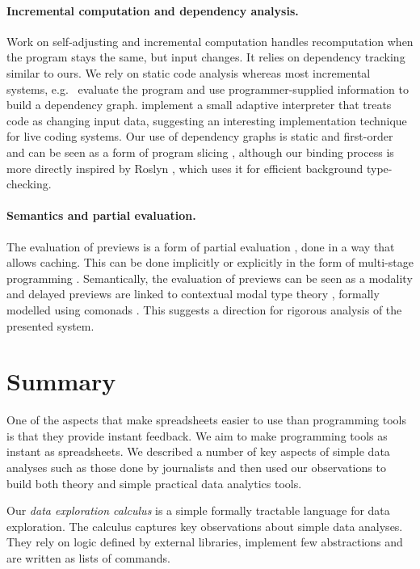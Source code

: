 \documentclass[english,submission]{programming}
\theoremstyle{plain}
\theoremstyle{definition}
\begin{document}
\paragraph{Incremental computation and dependency analysis.}
Work on self-adjusting and incremental computation \cite{selfadjusting,adapton} handles
recomputation when the program stays the same, but input changes. It relies on dependency tracking
similar to ours. We rely on static code analysis whereas most incremental systems,
e.g.~\cite{incremental,adaptivefp,deltaml} evaluate the program and use programmer-supplied
information to build a dependency graph. \cite{adapton} implement a small adaptive interpreter
that treats code as changing input data, suggesting an interesting implementation technique for
live coding systems. Our use of dependency graphs \cite{dependencies} is static and first-order
and can be seen as a form of program slicing \cite{slicing}, although our binding process is
more directly inspired by Roslyn \cite{roslyn}, which uses it for efficient background type-checking.

\paragraph{Semantics and partial evaluation.}
The evaluation of previews is a form of partial evaluation \cite{partial}, done in a
way that allows caching. This can be done implicitly or explicitly in the form of
multi-stage programming \cite{metaml}. Semantically, the evaluation of previews can be seen as a
modality \cite{modal} and delayed previews are linked to contextual modal type theory \cite{cmtt},
formally modelled using comonads \cite{cmtt-denotation}. This suggests a direction for rigorous
analysis of the presented system.



%
\section{Summary}
One of the aspects that make spreadsheets easier to use than programming tools is that they
provide instant feedback. We aim to make programming tools as instant as spreadsheets.
We described a number of key aspects of simple data analyses such as those done by journalists
and then used our observations to build both theory and simple practical data analytics tools.

Our \emph{data exploration calculus} is a simple formally tractable language
for data exploration. The calculus captures key observations about simple data analyses. They
rely on logic defined by external libraries, implement few abstractions and are written as lists of
commands.
\end{document}
